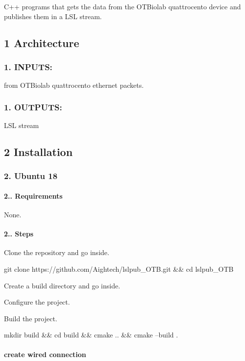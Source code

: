 C++ programs that gets the data from the O\+T\+Biolab quattrocento device and publishes them in a L\+SL stream.

\subsection*{1 Architecture}

\subsubsection*{1. I\+N\+P\+U\+TS\+:}


\begin{DoxyItemize}
\item from O\+T\+Biolab quattrocento ethernet packets. \subsubsection*{1. O\+U\+T\+P\+U\+TS\+:}
\end{DoxyItemize}


\begin{DoxyItemize}
\item L\+SL stream
\end{DoxyItemize}

\subsection*{2 Installation}

\subsubsection*{2. Ubuntu 18}

\paragraph*{2.. {\bfseries Requirements}}

None. \paragraph*{2.. Steps}


\begin{DoxyItemize}
\item Clone the repository and go inside. 
\begin{DoxyCode}
git clone https://github.com/Aightech/lslpub\_OTB.git && cd lslpub\_OTB
\end{DoxyCode}

\item Create a build directory and go inside.
\item Configure the project.
\item Build the project. 
\begin{DoxyCode}
mkdir build && cd build && cmake .. && cmake --build .
\end{DoxyCode}
 \paragraph*{create wired connection}
\end{DoxyItemize}

